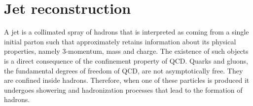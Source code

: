 




\section{Jet reconstruction}
\label{section:jet_reco}

A jet is a collimated spray of hadrons that is interpreted as coming from a single initial parton such that approximately retains information about its physical properties, namely 3-momentum, mass and charge. The existence of such objects is a direct consequence of the confinement property of QCD. Quarks and gluons, the fundamental degrees of freedom of QCD, are not asymptotically free. They are confined inside hadrons. Therefore, when one of these particles is produced it undergoes showering and hadronization processes that lead to the formation of hadrons.

